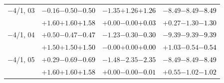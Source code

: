 \documentclass[compress]{beamer}
\begin{document}
\begin{frame}
\begin{tabular}{r | c | c | c}
$-$4/1, 03 & $-0.16$\hspace{0.1 cm}$-0.50$\hspace{0.1 cm}\textcolor{black}{$-0.50$} & $-1.35$\hspace{0.1 cm}$+1.26$\hspace{0.1 cm}\textcolor{black}{$+1.26$} & $-8.49$\hspace{0.1 cm}$-8.49$\hspace{0.1 cm}\textcolor{black}{$-8.49$} \\
           & $+1.60$\hspace{0.1 cm}$+1.60$\hspace{0.1 cm}\textcolor{black}{$+1.58$} & $+0.00$\hspace{0.1 cm}$-0.00$\hspace{0.1 cm}\textcolor{black}{$+0.03$} & $+0.27$\hspace{0.1 cm}$-1.30$\hspace{0.1 cm}\textcolor{black}{$-1.30$} \\
$-$4/1, 04 & $+0.50$\hspace{0.1 cm}$-0.47$\hspace{0.1 cm}\textcolor{black}{$-0.47$} & $-1.23$\hspace{0.1 cm}$-0.30$\hspace{0.1 cm}\textcolor{black}{$-0.30$} & $-9.39$\hspace{0.1 cm}$-9.39$\hspace{0.1 cm}\textcolor{black}{$-9.39$} \\
           & $+1.50$\hspace{0.1 cm}$+1.50$\hspace{0.1 cm}\textcolor{black}{$+1.50$} & $-0.00$\hspace{0.1 cm}$+0.00$\hspace{0.1 cm}\textcolor{black}{$+0.00$} & $+1.03$\hspace{0.1 cm}$-0.54$\hspace{0.1 cm}\textcolor{black}{$-0.54$} \\
$-$4/1, 05 & $+0.29$\hspace{0.1 cm}$-0.69$\hspace{0.1 cm}\textcolor{black}{$-0.69$} & $-1.48$\hspace{0.1 cm}$-2.35$\hspace{0.1 cm}\textcolor{black}{$-2.35$} & $-8.49$\hspace{0.1 cm}$-8.49$\hspace{0.1 cm}\textcolor{black}{$-8.49$} \\
           & $+1.60$\hspace{0.1 cm}$+1.60$\hspace{0.1 cm}\textcolor{black}{$+1.58$} & $+0.00$\hspace{0.1 cm}$-0.00$\hspace{0.1 cm}\textcolor{black}{$-0.01$} & $+0.55$\hspace{0.1 cm}$-1.02$\hspace{0.1 cm}\textcolor{black}{$-1.02$} \\

\end{tabular}
\end{frame}
\end{document}
